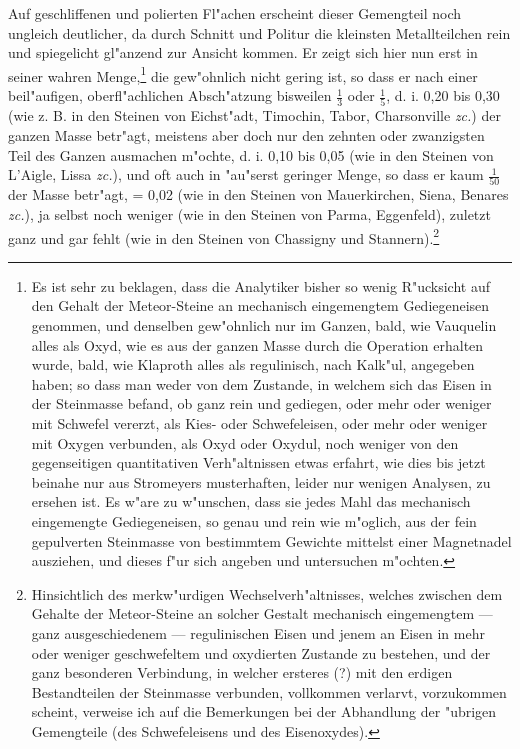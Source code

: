\documentclass[a4paper, 11pt, oneside, german]{article}
\begin{document}
Auf geschliffenen und polierten Fl"achen erscheint dieser Gemengteil noch ungleich deutlicher, da durch Schnitt und Politur die kleinsten Metallteilchen rein und spiegelicht gl"anzend zur Ansicht kommen. Er zeigt sich hier nun erst in seiner wahren Menge,\footnote{Es ist sehr zu beklagen, dass die Analytiker bisher so wenig R"ucksicht auf den Gehalt der Meteor-Steine an mechanisch eingemengtem Gediegeneisen genommen, und denselben gew"ohnlich nur im Ganzen, bald, wie Vauquelin alles als Oxyd, wie es aus der ganzen Masse durch die Operation erhalten wurde, bald, wie Klaproth alles als regulinisch, nach Kalk"ul, angegeben haben; so dass man weder von dem Zustande, in welchem sich das Eisen in der Steinmasse befand, ob ganz rein und gediegen, oder mehr oder weniger mit Schwefel vererzt, als Kies- oder Schwefeleisen, oder mehr oder weniger mit Oxygen verbunden, als Oxyd oder Oxydul, noch weniger von den gegenseitigen quantitativen Verh"altnissen etwas erfahrt, wie dies bis jetzt beinahe nur aus Stromeyers musterhaften, leider nur wenigen Analysen, zu ersehen ist. Es w"are zu w"unschen, dass sie jedes Mahl das mechanisch eingemengte Gediegeneisen, so genau und rein wie m"oglich, aus der fein gepulverten Steinmasse von bestimmtem Gewichte mittelst einer Magnetnadel ausziehen, und dieses f"ur sich angeben und untersuchen m"ochten.} die gew"ohnlich nicht gering ist, so dass er nach einer beil"aufigen, oberfl"achlichen Absch"atzung bisweilen $\frac{1}{3}$ oder $\frac{1}{5}$, d. i. 0,20 bis 0,30 (wie z. B. in den Steinen von Eichst"adt, Timochin, Tabor, Charsonville \emph{zc.}) der ganzen Masse betr"agt, meistens aber doch nur den zehnten oder zwanzigsten Teil des Ganzen ausmachen m"ochte, d. i. 0,10 bis 0,05 (wie in den Steinen von L'Aigle, Lissa \emph{zc.}), und oft auch in "au"serst geringer Menge, so dass er kaum $\frac{1}{50}$ der Masse betr"agt, = 0,02 (wie in den Steinen von Mauerkirchen, Siena, Benares \emph{zc.}), ja selbst noch weniger (wie in den Steinen von Parma, Eggenfeld), zuletzt ganz und gar fehlt (wie in den Steinen von Chassigny und Stannern).\footnote{Hinsichtlich des merkw"urdigen Wechselverh"altnisses, welches zwischen dem Gehalte der Meteor-Steine an solcher Gestalt mechanisch eingemengtem --- ganz ausgeschiedenem --- regulinischen Eisen und jenem an Eisen in mehr oder weniger geschwefeltem und oxydierten Zustande zu bestehen, und der ganz besonderen Verbindung, in welcher ersteres (?) mit den erdigen Bestandteilen der Steinmasse verbunden, vollkommen verlarvt, vorzukommen scheint, verweise ich auf die Bemerkungen bei der Abhandlung der "ubrigen Gemengteile (des Schwefeleisens und des Eisenoxydes).}
\end{document}
